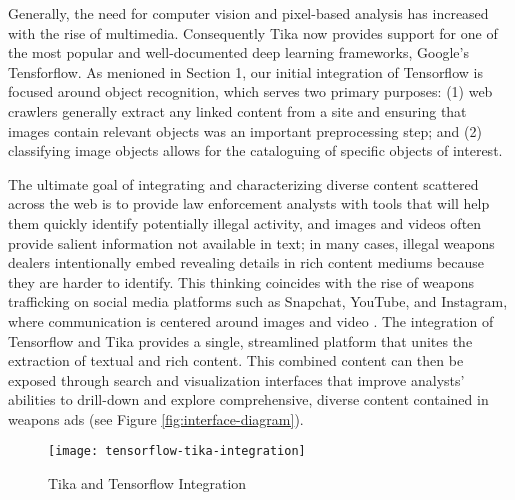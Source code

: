 Generally,  the need for computer vision and pixel-based analysis has increased with the rise of multimedia. Consequently Tika now provides support for one of the most popular and well-documented deep learning frameworks, Google's Tensforflow. As menioned in Section 1, our initial integration of Tensorflow is focused around object recognition, which serves two primary purposes: (1) web crawlers generally extract any linked content from a site and ensuring that images contain relevant objects was an important preprocessing step; and (2) classifying image objects allows for the cataloguing of specific objects of interest. 

The ultimate goal of integrating and characterizing diverse content scattered across the web is to provide law enforcement analysts with tools that will help them quickly identify potentially illegal activity, and images and videos often provide salient information not available in text; in many cases, illegal weapons dealers intentionally embed revealing details in rich content mediums because they are harder to identify. This thinking coincides with the rise of weapons trafficking on social media platforms such as Snapchat, YouTube, and Instagram, where communication is centered around images and video \cite{socialmedia}. The integration of Tensorflow and Tika provides a single, streamlined platform that unites the extraction of textual and rich content. This combined content can then be exposed through search and visualization interfaces that improve analysts' abilities to drill-down and explore comprehensive, diverse content contained in weapons ads (see Figure \ref{fig:interface-diagram}). 

\begin{figure*}[!t]
        \texttt{[image: tensorflow-tika-integration]}
        \caption{Tika and Tensorflow Integration}
        \label{fig:tf-tika-integration}
\end{figure*}

